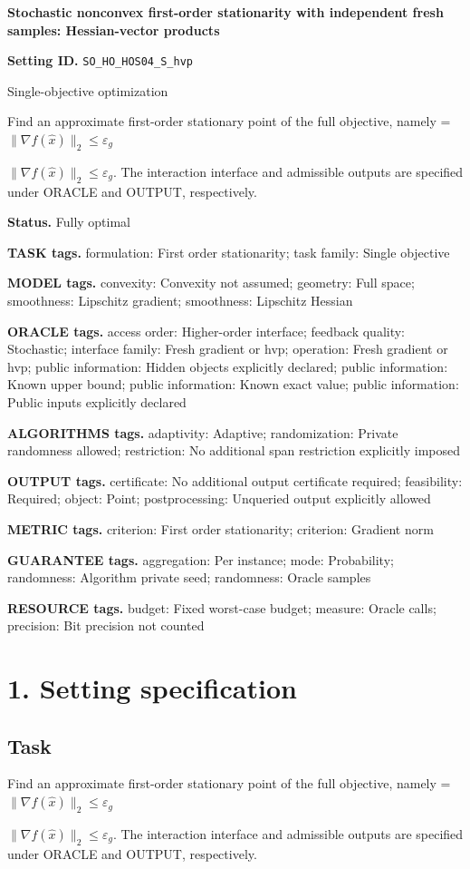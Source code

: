 \documentclass[10pt,a4paper]{article}
\newcommand{\AtlasMath}[1]{\par\begingroup\centering\setbox0=\hbox{$\displaystyle #1$}\ifdim\wd0>1.4\linewidth\typeout{ATLAS WIDE FORMULA: \the\wd0}\fi\ifdim\wd0>\linewidth\resizebox{\linewidth}{!}{\box0}\else\box0\fi\par\endgroup}
\newcommand{\AtlasInlineMath}[1]{\begingroup\setbox0=\hbox{$#1$}\ifdim\wd0>.4\linewidth\endgroup\AtlasMath{#1}\else\endgroup$#1$\fi}
\begin{document}
\raggedright

{\LARGE\bfseries\sffamily\color{AtlasNavy} Stochastic nonconvex first-order stationarity with independent fresh samples: Hessian-vector products\par}\vspace{5pt}
\textbf{Setting ID.} \texttt{SO\_\allowbreak{}HO\_\allowbreak{}HOS04\_\allowbreak{}S\_\allowbreak{}hvp}

Single-objective optimization

Find an approximate first-order stationary point of the full objective, namely \AtlasInlineMath{\|\nabla f(\widehat{x})\|_2\le\varepsilon_g}. The interaction interface and admissible outputs are specified under ORACLE and OUTPUT, respectively.

\textbf{Status.} Fully optimal

\textbf{TASK tags.} formulation: First order stationarity; task family: Single objective

\textbf{MODEL tags.} convexity: Convexity not assumed; geometry: Full space; smoothness: Lipschitz gradient; smoothness: Lipschitz Hessian

\textbf{ORACLE tags.} access order: Higher-order interface; feedback quality: Stochastic; interface family: Fresh gradient or hvp; operation: Fresh gradient or hvp; public information: Hidden objects explicitly declared; public information: Known upper bound; public information: Known exact value; public information: Public inputs explicitly declared

\textbf{ALGORITHMS tags.} adaptivity: Adaptive; randomization: Private randomness allowed; restriction: No additional span restriction explicitly imposed

\textbf{OUTPUT tags.} certificate: No additional output certificate required; feasibility: Required; object: Point; postprocessing: Unqueried output explicitly allowed

\textbf{METRIC tags.} criterion: First order stationarity; criterion: Gradient norm

\textbf{GUARANTEE tags.} aggregation: Per instance; mode: Probability; randomness: Algorithm private seed; randomness: Oracle samples

\textbf{RESOURCE tags.} budget: Fixed worst-case budget; measure: Oracle calls; precision: Bit precision not counted

\section{1. Setting specification}
\subsection{Task}
Find an approximate first-order stationary point of the full objective, namely \AtlasInlineMath{\|\nabla f(\widehat{x})\|_2\le\varepsilon_g}. The interaction interface and admissible outputs are specified under ORACLE and OUTPUT, respectively.
\end{document}
